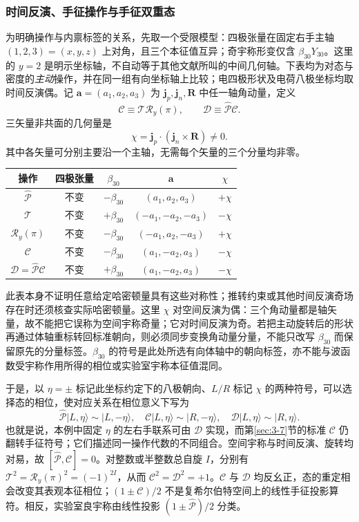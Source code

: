 \subsubsection{时间反演、手征操作与手征双重态}

为明确操作与内禀标签的关系，先取一个受限模型：四极张量在固定右手主轴 $(1,2,3)=(x,y,z)$ 上对角，且三个本征值互异；奇宇称形变仅含 $\beta_{30}Y_{30}$。这里的 $y=2$ 是明示坐标轴，不自动等于其他文献所叫的中间几何轴。下表均为对态与密度的\emph{主动}操作，并在同一组有向坐标轴上比较；电四极形状及电荷八极坐标均取时间反演偶。记 $\mathbf{a}=(a_1,a_2,a_3)$ 为 $\mathbf j_p,\mathbf j_n,\mathbf R$ 中任一轴角动量，定义
\begin{equation}\label{eq:4-5-chiral-op}
\mathcal C\equiv\mathcal T\mathcal R_y(\pi),\qquad
\mathcal D\equiv\hat{\mathcal P}\mathcal C.
\end{equation}
三矢量非共面的几何量是
\begin{equation}\label{eq:4-5-chiral-triple-product}
\chi=\mathbf j_p\cdot(\mathbf j_n\times\mathbf R)\ne0.
\end{equation}
其中各矢量可分别主要沿一个主轴，无需每个矢量的三个分量均非零。
\begin{center}
\begin{tabular}{c|c|c|c|c}
操作 & 四极张量 & $\beta_{30}$ & $\mathbf a$ & $\chi$ \\
\hline
$\hat{\mathcal P}$ & 不变 & $-\beta_{30}$ & $(a_1,a_2,a_3)$ & $+\chi$ \\
$\mathcal T$ & 不变 & $+\beta_{30}$ & $(-a_1,-a_2,-a_3)$ & $-\chi$ \\
$\mathcal R_y(\pi)$ & 不变 & $-\beta_{30}$ & $(-a_1,a_2,-a_3)$ & $+\chi$ \\
$\mathcal C$ & 不变 & $-\beta_{30}$ & $(a_1,-a_2,a_3)$ & $-\chi$ \\
$\mathcal D=\hat{\mathcal P}\mathcal C$ & 不变 & $+\beta_{30}$ & $(a_1,-a_2,a_3)$ & $-\chi$
\end{tabular}
\end{center}
此表本身不证明任意给定哈密顿量具有这些对称性；推转约束或其他时间反演奇场存在时还须核查实际哈密顿量。这里 $\chi$ 对空间反演为偶：三个角动量都是轴矢量，故不能把它误称为空间宇称奇量；它对时间反演为奇。若把主动旋转后的形状再通过体轴重标转回标准朝向，则必须同步变换角动量分量，不能只改写 $\beta_{30}$ 而保留原先的分量标签。$\beta_{30}$ 的符号是此处所选有向体轴中的朝向标签，亦不能与波函数受宇称作用所得的相位或实验室宇称本征值混同。

于是，以 $\eta=\pm$ 标记此坐标约定下的八极朝向、$L/R$ 标记 $\chi$ 的两种符号，可以选择态的相位，使对应关系在相位意义下写为
\[
\hat{\mathcal P}|L,\eta\rangle\sim|L,-\eta\rangle,\quad
\mathcal C|L,\eta\rangle\sim|R,-\eta\rangle,\quad
\mathcal D|L,\eta\rangle\sim|R,\eta\rangle.
\]
也就是说，本例中固定 $\eta$ 的左右手联系可由 $\mathcal D$ 实现，而第\ref{sec:3-7}节的标准 $\mathcal C$ 仍翻转手征符号；它们描述同一操作代数的不同组合。空间宇称与时间反演、旋转均对易，故 $[\hat{\mathcal P},\mathcal C]=0$。对整数或半整数总自旋 $I$，分别有 $\mathcal T^2=\mathcal R_y(\pi)^2=(-1)^{2I}$，从而 $\mathcal C^2=\mathcal D^2=+1$。$\mathcal C$ 与 $\mathcal D$ 均反幺正，态的重定相会改变其表观本征相位；$(1\pm\mathcal C)/2$ 不是复希尔伯特空间上的线性手征投影算符。相反，实验室良宇称由线性投影 $(1\pm\hat{\mathcal P})/2$ 分类。

